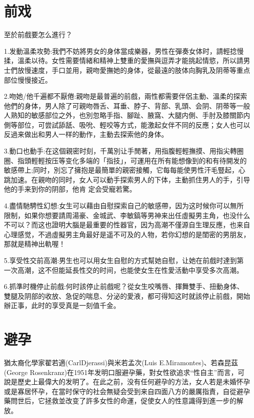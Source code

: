 \documentclass[12pt,UTF8]{ctexbook}
\begin{document}
\chapter{前戏}

至於前戲要怎么進行？

1.发動溫柔攻勢:我們不妨將男女的身体當成樂器，男性在彈奏女体时，請輕捻慢揉，溫柔以待。女性需要情緒和精神上雙重的愛撫與逗弄才能挑起情慾，所以請男士們放慢速度，手口並用，親吻愛撫她的身体，從最遠的肢体向胸乳及阴蒂等重点部位慢慢接近。

2.吻她/他千遍都不厭倦:親吻是最普遍的前戲，兩性都需要伴侶主動、溫柔的探索他們的身体，男人除了可親吻唇舌、耳垂、脖子、背部、乳頭、会阴、阴蒂等一般人熟知的敏感部位之外，也別忽略手指、腳趾、腋窩、大腿内側、手肘及膝關節内側等部位，可尝試舔舐、吸吮、輕咬等方式，能激起女伴不同的反應；女人也可以反過来做出和男人一样的動作，主動去探索他的身体。

3.動口也動手:在这個親密时刻，千萬別让手閒著，用指腹輕輕撫摸、用指尖轉圈圈、指頭輕輕按压等变化多端的「指技」，可運用在所有能想像到的和有待開发的敏感帶上;同时，別忘了擁抱是最簡單的親密接觸，它每每能使男性汗毛豎起，心跳加速。在親吻的同时，女人可以動手探索男人的下体，主動抓住男人的手，引导他的手来到你的阴部，他肯
定会受寵若驚。

4.盡情馳騁性幻想:女生可以藉由自慰探索自己的敏感帶，因为这时候你可以無所限制，如果你想要請周湯豪、金城武、李敏鎬等男神来出任虛擬男主角，也没什么不可以？而这也證明大腦是最重要的性器官，因为高潮不僅源自生理反應，也来自心理感觉，不過虛擬男主角最好是遥不可及的人物，若你幻想的是閨密的男朋友，那就是精神出軌喔！

5.享受性交前高潮:男生也可以用女生自慰的方式幫她自慰，让她在前戲时達到第一次高潮，这不但能延長性交的时间，也能使女生在性愛活動中享受多次高潮。

6.抓準时機停止前戲:何时該停止前戲呢？從女生咬嘴唇、揮舞雙手、扭動身体、雙腿及阴部的收放、急促的喘息、分泌的愛液，都可得知这时就該停止前戲，開始辦正事，此时的享受真是一刻值千金。

\chapter{避孕}

猶太裔化學家翟若適(CarlDjerassi)與米若孟次(Luis E.Miramontes)、若森昆茲(George Rosenkranz)在1951年发明口服避孕藥，對女性欲追求“性自主”而言，可說是歷史上最偉大的发明了。在此之前，没有任何避孕的方法，女人若是未婚怀孕或是寡居怀孕，在當时保守的社会無疑会受到来自四面八方的嚴厲指責，自從避孕藥問世后，它拯救並改变了許多女性的命運，促使女人的性意識得到進一步的解放。
\end{document}
